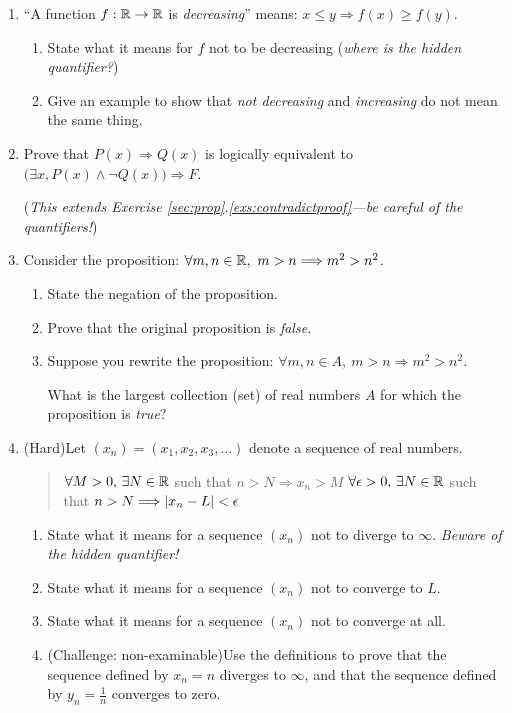 \begin{exercises}{}{}
\begin{enumerate}
			
		\item\label{ex:decreasing} ``A function $f:\mathbb{R}\to\mathbb{R}$ is \emph{decreasing}'' means: $x\le y\Longrightarrow f(x)\ge f(y)$.
		\begin{enumerate}
		  \item State what it means for $f$ not to be decreasing (\emph{where is the hidden quantifier?})
		  \item Give an example to show that \emph{not decreasing} and \emph{increasing} do not mean the same thing.
		\end{enumerate}
		
		
		\item\label{exs:contradictproof2} Prove that $P(x)\Longrightarrow Q(x)$ is logically equivalent to $\bigl(\exists x, P(x)\wedge\neg Q(x)\bigr)\Longrightarrow F$.\par
		(\emph{This extends Exercise \ref*{sec:prop}.\ref{exs:contradictproof}---be careful of the quantifiers!})
		
			
		\item Consider the proposition: $\forall m,n\in\mathbb{R},\ m>n\Longrightarrow m^2>n^2$.
		\begin{enumerate}
	  	\item State the negation of the proposition.
	  	\item Prove that the original proposition is \emph{false.}
	  	\item Suppose you rewrite the proposition: $\forall m,n\in A, \ m>n\Longrightarrow m^2>n^2$.\par
	  	What is the largest collection (set) of real numbers $A$ for which the proposition is \emph{true}?
		\end{enumerate}
	
		
		\item (Hard)\lstsp Let $(x_n)=(x_1,x_2,x_3,\ldots)$ denote a sequence of real numbers.
		\begin{quote}
			$\forall M>0,\,\exists N\in\mathbb{R}$ such that $n>N\Longrightarrow x_n>M$\smallbreak
			$\forall\epsilon>0,\,\exists N\in\mathbb{R}$ such that $n>N\Longrightarrow \left| x_n-L\right|<\epsilon$
		\end{quote}
		\begin{enumerate}
		  \item State what it means for a sequence $(x_n)$ not to diverge to $\infty$. \emph{Beware of the hidden quantifier!}
		  \item State what it means for a sequence $(x_n)$ not to converge to $L$.
		  \item State what it means for a sequence $(x_n)$ not to converge at all.
		  \item (Challenge: non-examinable)\lstsp Use the definitions to prove that the sequence defined by $x_n=n$ diverges to $\infty$, and that the sequence defined by $y_n=\frac 1n$ converges to zero.
		\end{enumerate}
	
	\end{enumerate}

\end{exercises}


